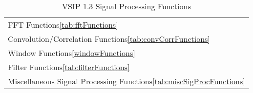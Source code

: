 \begin{table}[H]
\caption{VSIP 1.3 Signal Processing Functions}
\label{tab:signalProcessingFunctions}
\begin{center}
\begin{tabular}{|l|}\hline
FFT Functions\ref{tab:fftFunctions}\\
Convolution/Correlation Functions\ref{tab:convCorrFunctions}\\
Window Functions\ref{windowFunctions}\\
Filter Functions\ref{tab:filterFunctions}\\
Miscellaneous Signal Processing Functions\ref{tab:miscSigProcFunctions}\\
\hline\end{tabular}
\end{center}
\label{default}
\end{table}%